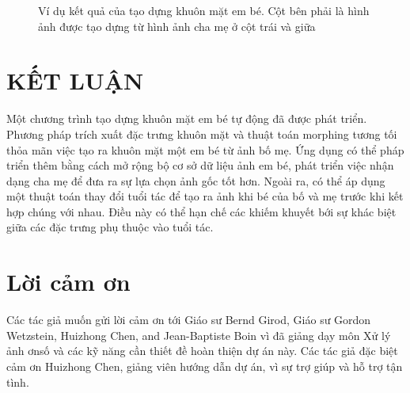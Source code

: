 \documentclass[journal]{IEEEtran}
\begin{document}
\begin{figure}[!t]
\label{refhinh13}
\caption{Ví dụ kết quả của tạo dựng khuôn mặt em bé. Cột bên phải là hình ảnh được tạo dựng từ hình ảnh cha mẹ ở cột trái và giữa}
\end{figure}


\section{KẾT LUẬN}
Một chương trình tạo dựng khuôn mặt em bé tự động đã được phát triển. Phương pháp trích xuất đặc trưng khuôn mặt và thuật toán morphing tương tối thỏa mãn việc tạo ra khuôn mặt một em bé từ ảnh bố mẹ. Ứng dụng có thể pháp triển thêm bằng cách mở rộng bộ cơ sở dữ liệu ảnh em bé, phát triển việc nhận dạng cha mẹ để đưa ra sự lựa chọn ảnh gốc tốt hơn. Ngoài ra, có thể áp dụng một thuật toán thay đổi tuổi tác để tạo ra ảnh khi bé của bố và mẹ trước khi kết hợp chúng với nhau. Điều này có thể hạn chế các khiếm khuyết bới sự khác biệt giữa các đặc trưng phụ thuộc vào tuổi tác.

\section*{Lời cảm ơn}
Các tác giả muốn gửi lời cảm ơn tới Giáo sư Bernd Girod, Giáo sư Gordon Wetzstein, Huizhong Chen, and Jean-Baptiste Boin vì đã giảng dạy môn Xử lý ảnh ơnsố và các kỹ năng cần thiết đề hoàn thiện dự án này. Các tác giả đặc biệt cảm ơn Huizhong Chen, giảng viên hướng dẫn dự án, vì sự trợ giúp và hỗ trợ tận tình.





\end{document}
